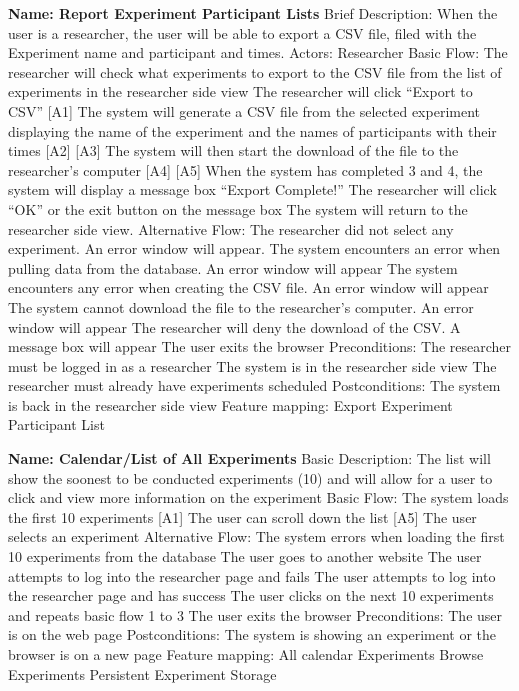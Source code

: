 \begin{outline}[enumerate]
\1 {\bf Name: Report Experiment Participant Lists}
\2 Brief Description:  When the user is a researcher, the user will be able to export a CSV file, filed with the Experiment name and participant and times.
\2 Actors: Researcher
\2 Basic Flow:
\3 The researcher will check what experiments to export to the CSV file from the list of experiments in the researcher side view
\3 The researcher will click ``Export to CSV” [A1] 
\3 The system will generate a CSV file from the selected experiment displaying the name of the experiment and the names of participants with their times [A2] [A3]
\3 The system will then start the download of the file to the researcher's computer [A4] [A5]
\3 When the system has completed 3 and 4, the system will display a message box “Export Complete!”
\3 The researcher will click ``OK” or the exit button on the message box
\3 The system will return to the researcher side view.
\2 Alternative Flow:
\3 [A1] The researcher did not select any experiment.  An error window will appear.
\3 [A2] The system encounters an error when pulling data from the database. An error window will appear
\3 [A3] The system encounters any error when creating the CSV file. An error window will appear
\3 [A4] The system cannot download the file to the researcher's computer. An error window will appear
\3 [A5] The researcher will deny the download of the CSV.  A message box will appear
\3 [A6] The user exits the browser
\2 Preconditions:
\3 The researcher must be logged in as a researcher
\3 The system is in the researcher side view
\3 The researcher must already have experiments scheduled
\2 Postconditions:
\3 The system is back in the researcher side view
\2 Feature mapping:
\3 Export Experiment Participant List

\1 {\bf Name: Calendar/List of All Experiments}
\2 Basic Description: The list will show the soonest to be conducted experiments (10) and will allow for a user to click and view more information on the experiment
\2 Basic Flow:
\3 The system loads the first 10 experiments [A1]
\3 The user can scroll down the list [A5]
\3 The user selects an experiment
\2 Alternative Flow:
\3 [A1] The system errors when loading the first 10 experiments from the database
\3 [A2] The user goes to another website
\3 [A3] The user attempts to log into the researcher page and fails
\3 [A4] The user attempts to log into the researcher page and has success
\3 [A5] The user clicks on the next 10 experiments and repeats basic flow 1 to 3
\3 [A6] The user exits the browser
\2 Preconditions:
\3 The user is on the web page
\2 Postconditions:
\3 The system is showing an experiment or the browser is on a new page
\2 Feature mapping:
\3 All calendar Experiments
\3 Browse Experiments
\3 Persistent Experiment Storage
\end{outline}